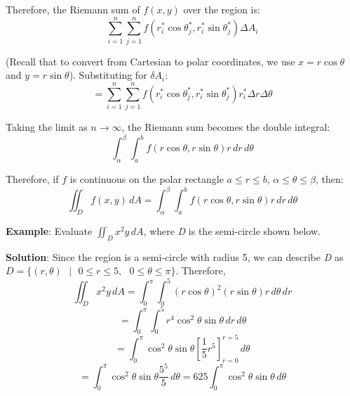 Therefore, the Riemann sum of $f(x,y)$ over the region is:
$$\sum_{i = 1}^n \sum_{j = 1}^n f(r_i^* \cos{\theta_j^*}, r_i^* \sin{\theta_j^*
}) \Delta A_i$$

(Recall that to convert from Cartesian to polar coordinates, we use $x = r\cos{
\theta}$ and $y = r\sin{\theta}$). Substituting for $\delta A_i$:
$$= \sum_{i = 1}^n \sum_{j = 1}^n f(r_i^* \cos{\theta_j^*}, r_i^* \sin{\theta_j
^*}) r_i^* \Delta r \Delta \theta$$

Taking the limit as $n \to \infty$, the Riemann sum becomes the double integral:
$$\int_{\alpha}^{\beta} \int_a^b f(r\cos{\theta}, r\sin{\theta}) r\,dr\,d
\theta$$

Therefore, if $f$ is continuous on the polar rectangle $a \leq r \leq b$, 
$\alpha \leq \theta \leq \beta$, then:
$$\iint_{\textit{D}} f(x,y)\,dA = \int_{\alpha}^{\beta} \int_a^b f(r\cos{\theta
}, r\sin{\theta})r\,dr\,d\theta$$

\textbf{Example}: Evaluate $\iint_{\textit{D}} x^2y\,dA$, where \textit{D} is 
the semi-circle shown below. 

\begin{center}
\end{center}

\textbf{Solution}: Since the region is a semi-circle with radius 5, we can 
describe \textit{D} as $\textit{D} = \{(r, \theta)\text{ }|\text{ }0 \leq r 
\leq 5,\text{ }0 \leq \theta \leq \pi\}$. Therefore, 
$$\iint_{\textit{D}} x^2y\,dA = \int_0^{\pi} \int_0^5 \left(r\cos{\theta} 
\right)^2 \left(r \sin{\theta}\right) r\,d\theta\,dr$$
$$= \int_0^{\pi} \int_0^5 r^4 \cos^2{\theta} \sin{\theta}\,dr\,d\theta$$
$$= \int_0^{\pi} \cos^2{\theta} \sin{\theta} \left[ \frac{1}{5}r^5 \right]_{r 
= 0}^{r = 5}\,d\theta$$
$$=\int_0^{\pi} \cos^2{\theta} \sin{\theta} \frac{5^5}{5}\,d\theta = 625 \int_0
^{\pi} \cos^2{\theta}\sin{\theta}\,d\theta$$


